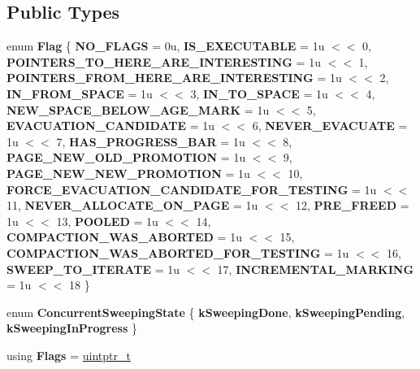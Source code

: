 \subsection*{Public Types}
\begin{DoxyCompactItemize}
\item 
\mbox{\label{classv8_1_1internal_1_1MemoryChunk_a2c32c7399297f6372f5d73ff566a9229}} 
enum {\bfseries Flag} \{ \newline
{\bfseries N\+O\+\_\+\+F\+L\+A\+GS} = 0u, 
{\bfseries I\+S\+\_\+\+E\+X\+E\+C\+U\+T\+A\+B\+LE} = 1u $<$$<$ 0, 
{\bfseries P\+O\+I\+N\+T\+E\+R\+S\+\_\+\+T\+O\+\_\+\+H\+E\+R\+E\+\_\+\+A\+R\+E\+\_\+\+I\+N\+T\+E\+R\+E\+S\+T\+I\+NG} = 1u $<$$<$ 1, 
{\bfseries P\+O\+I\+N\+T\+E\+R\+S\+\_\+\+F\+R\+O\+M\+\_\+\+H\+E\+R\+E\+\_\+\+A\+R\+E\+\_\+\+I\+N\+T\+E\+R\+E\+S\+T\+I\+NG} = 1u $<$$<$ 2, 
\newline
{\bfseries I\+N\+\_\+\+F\+R\+O\+M\+\_\+\+S\+P\+A\+CE} = 1u $<$$<$ 3, 
{\bfseries I\+N\+\_\+\+T\+O\+\_\+\+S\+P\+A\+CE} = 1u $<$$<$ 4, 
{\bfseries N\+E\+W\+\_\+\+S\+P\+A\+C\+E\+\_\+\+B\+E\+L\+O\+W\+\_\+\+A\+G\+E\+\_\+\+M\+A\+RK} = 1u $<$$<$ 5, 
{\bfseries E\+V\+A\+C\+U\+A\+T\+I\+O\+N\+\_\+\+C\+A\+N\+D\+I\+D\+A\+TE} = 1u $<$$<$ 6, 
\newline
{\bfseries N\+E\+V\+E\+R\+\_\+\+E\+V\+A\+C\+U\+A\+TE} = 1u $<$$<$ 7, 
{\bfseries H\+A\+S\+\_\+\+P\+R\+O\+G\+R\+E\+S\+S\+\_\+\+B\+AR} = 1u $<$$<$ 8, 
{\bfseries P\+A\+G\+E\+\_\+\+N\+E\+W\+\_\+\+O\+L\+D\+\_\+\+P\+R\+O\+M\+O\+T\+I\+ON} = 1u $<$$<$ 9, 
{\bfseries P\+A\+G\+E\+\_\+\+N\+E\+W\+\_\+\+N\+E\+W\+\_\+\+P\+R\+O\+M\+O\+T\+I\+ON} = 1u $<$$<$ 10, 
\newline
{\bfseries F\+O\+R\+C\+E\+\_\+\+E\+V\+A\+C\+U\+A\+T\+I\+O\+N\+\_\+\+C\+A\+N\+D\+I\+D\+A\+T\+E\+\_\+\+F\+O\+R\+\_\+\+T\+E\+S\+T\+I\+NG} = 1u $<$$<$ 11, 
{\bfseries N\+E\+V\+E\+R\+\_\+\+A\+L\+L\+O\+C\+A\+T\+E\+\_\+\+O\+N\+\_\+\+P\+A\+GE} = 1u $<$$<$ 12, 
{\bfseries P\+R\+E\+\_\+\+F\+R\+E\+ED} = 1u $<$$<$ 13, 
{\bfseries P\+O\+O\+L\+ED} = 1u $<$$<$ 14, 
\newline
{\bfseries C\+O\+M\+P\+A\+C\+T\+I\+O\+N\+\_\+\+W\+A\+S\+\_\+\+A\+B\+O\+R\+T\+ED} = 1u $<$$<$ 15, 
{\bfseries C\+O\+M\+P\+A\+C\+T\+I\+O\+N\+\_\+\+W\+A\+S\+\_\+\+A\+B\+O\+R\+T\+E\+D\+\_\+\+F\+O\+R\+\_\+\+T\+E\+S\+T\+I\+NG} = 1u $<$$<$ 16, 
{\bfseries S\+W\+E\+E\+P\+\_\+\+T\+O\+\_\+\+I\+T\+E\+R\+A\+TE} = 1u $<$$<$ 17, 
{\bfseries I\+N\+C\+R\+E\+M\+E\+N\+T\+A\+L\+\_\+\+M\+A\+R\+K\+I\+NG} = 1u $<$$<$ 18
 \}
\item 
\mbox{\label{classv8_1_1internal_1_1MemoryChunk_a3eedfd88d0a89355dae40d476f931ac6}} 
enum {\bfseries Concurrent\+Sweeping\+State} \{ {\bfseries k\+Sweeping\+Done}, 
{\bfseries k\+Sweeping\+Pending}, 
{\bfseries k\+Sweeping\+In\+Progress}
 \}
\item 
\mbox{\label{classv8_1_1internal_1_1MemoryChunk_aa0b8a36817db2eaa87010f8ee2139b05}} 
using {\bfseries Flags} = \mbox{\hyperlink{classuintptr__t}{uintptr\+\_\+t}}
\end{DoxyCompactItemize}
